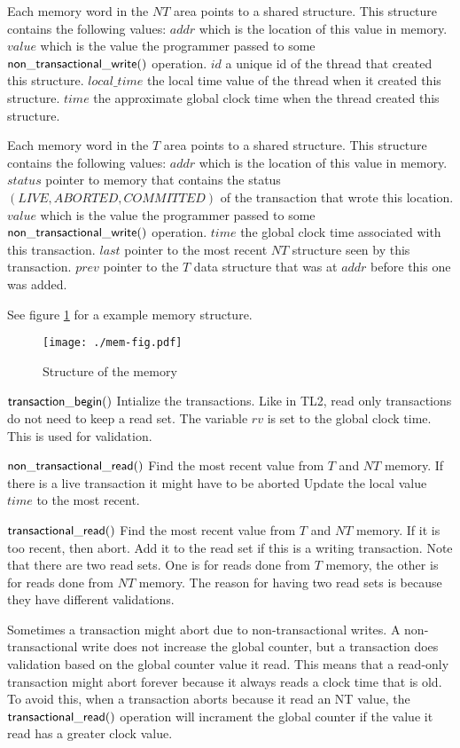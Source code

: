 \documentclass[11pt]{article}
\begin{document}
Each memory word in the $NT$ area points to a shared structure.
This structure contains the following values:
$addr$ which is the location of this value in memory.
$value$ which is the value the programmer passed to some ${\sf non\_transactional\_write}()$ operation.
$id$ a unique id of the thread that created this structure.
$local\_time$ the local time value of the thread when it created this structure.
$time$ the approximate global clock time when the thread created this structure.

Each memory word in the $T$ area points to a shared structure.
This structure contains the following values:
$addr$ which is the location of this value in memory.
$status$ pointer to memory that contains the status $(\mathit{LIVE}, \mathit{ABORTED}, \mathit{COMMITTED})$ of the transaction that wrote this location.
$value$ which is the value the programmer passed to some ${\sf non\_transactional\_write}()$ operation.
$time$ the global clock time associated with this transaction.
$last$ pointer to the most recent $NT$ structure seen by this transaction.
$prev$ pointer to the $T$ data structure that was at $addr$ before this one was added.

See figure \ref{fig:mem} for a example memory structure.

\begin{figure}[t]
	\begin{center}
	\texttt{[image: ./mem-fig.pdf]}
	\caption{Structure of the memory\label{fig:mem}}
	\end{center}
\end{figure}


{\bf ${\sf transaction\_begin}()$}
Intialize the transactions.
Like in TL2, read only transactions do not need to keep a read set.
The variable $rv$ is set to the global clock time.
This is used for validation.

{\bf ${\sf non\_transactional\_read}()$}
Find the most recent value from $T$ and $NT$ memory.
If there is a live transaction it might have to be aborted
Update the local value $time$ to the most recent.

{\bf ${\sf transactional\_read}()$}
Find the most recent value from $T$ and $NT$ memory.
If it is too recent, then abort.
Add it to the read set if this is a writing transaction.
Note that there are two read sets.
One is for reads done from $T$ memory, the other is for reads done from $NT$ memory.
The reason for having two read sets is because they have different validations.

Sometimes a transaction might abort due to non-transactional writes.
A non-transactional write does not increase the global counter, but a transaction does validation based on the
global counter value it read.
This means that a read-only transaction might abort forever because it always reads a clock time that is old.
To avoid this, when a transaction aborts because it read an NT value, the ${\sf transactional\_read}()$ operation
will incrament the global counter if the value it read has a greater clock value.
\end{document}
